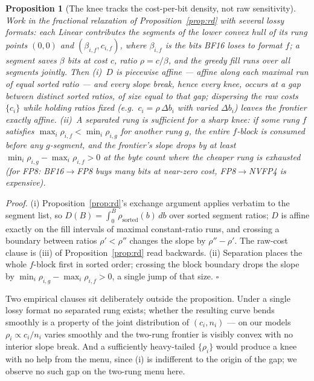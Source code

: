 \documentclass[11pt]{article}
\theoremstyle{plain}
\newtheorem{proposition}[theorem]{Proposition}
\theoremstyle{definition}
\begin{document}
\begin{proposition}[The knee tracks the cost-per-bit density, not raw sensitivity]\label{prop:knee}
Work in the fractional relaxation of Proposition~\ref{prop:rd} with several lossy
formats: each Linear contributes the segments of the lower convex hull of its rung
points $(0,0)$ and $(\beta_{i,f},c_{i,f})$, where $\beta_{i,f}$ is the bits BF16
loses to format $f$; a segment saves $\beta$ bits at cost $c$, ratio
$\rho=c/\beta$, and the greedy fill runs over all segments jointly. Then
(i)~$D$ is piecewise affine --- affine along each maximal run of equal sorted
ratio --- and every slope break, hence every knee, occurs at a gap between distinct
sorted ratios, of size equal to that gap; dispersing the raw costs $\{c_i\}$ while
holding ratios fixed (e.g.\ $c_i=\rho\,\Delta b_i$ with varied $\Delta b_i$) leaves
the frontier exactly affine. (ii)~A separated rung is sufficient for a sharp knee:
if some rung $f$ satisfies $\max_i\rho_{i,f}<\min_i\rho_{i,g}$ for another rung
$g$, the entire $f$-block is consumed before any $g$-segment, and the frontier's
slope drops by at least $\min_i\rho_{i,g}-\max_i\rho_{i,f}>0$ at the byte count
where the cheaper rung is exhausted (for FP8: BF16$\to$FP8 buys many bits at
near-zero cost, FP8$\to$NVFP4 is expensive).
\end{proposition}

\noindent\emph{Proof.} (i) Proposition~\ref{prop:rd}'s exchange argument applies
verbatim to the segment list, so $D(B)=\int_0^B\rho_{\mathrm{sorted}}(b)\,db$ over
sorted segment ratios; $D$ is affine exactly on the fill intervals of maximal
constant-ratio runs, and crossing a boundary between ratios $\rho'<\rho''$ changes
the slope by $\rho''-\rho'$. The raw-cost clause is (iii) of
Proposition~\ref{prop:rd} read backwards. (ii) Separation places the whole
$f$-block first in sorted order; crossing the block boundary drops the slope by
$\min_i\rho_{i,g}-\max_i\rho_{i,f}>0$, a single jump of that size. \hfill$\square$

\medskip
Two empirical clauses sit deliberately outside the proposition. Under a single
lossy format no separated rung exists; whether the resulting curve bends smoothly
is a property of the joint distribution of $(c_i,n_i)$ --- on our models
$\rho_i\propto c_i/n_i$ varies smoothly and the two-rung frontier is visibly convex
with no interior slope break. And a sufficiently heavy-tailed $\{\rho_i\}$ would
produce a knee with no help from the menu, since (i) is indifferent to the origin
of the gap; we observe no such gap on the two-rung menu here.
\end{document}
